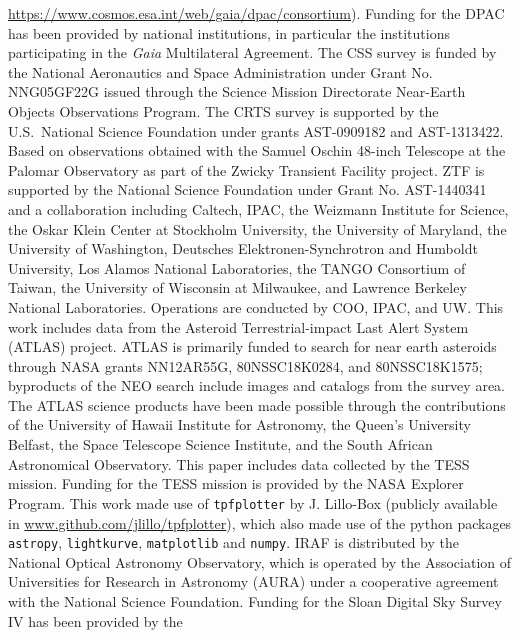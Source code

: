 \documentclass{aa}
\begin{document}
\begin{acknowledgements}
      \url{https://www.cosmos.esa.int/web/gaia/dpac/consortium}). Funding for the DPAC
      has been provided by national institutions, in particular the institutions
      participating in the {\it Gaia} Multilateral Agreement.
      The CSS survey is funded by the National Aeronautics and Space
      Administration under Grant No. NNG05GF22G issued through the Science
      Mission Directorate Near-Earth Objects Observations Program.  The CRTS
      survey is supported by the U.S.~National Science Foundation under
      grants AST-0909182 and AST-1313422.
      Based on observations obtained with the Samuel Oschin 48-inch Telescope
      at the Palomar Observatory as part of the Zwicky Transient Facility
      project. ZTF is supported by the National Science Foundation under Grant
      No. AST-1440341 and a collaboration including Caltech, IPAC, the
      Weizmann Institute for Science, the Oskar Klein Center at Stockholm
      University, the University of Maryland, the University of Washington,
      Deutsches Elektronen-Synchrotron and Humboldt University, Los Alamos
      National Laboratories, the TANGO Consortium of Taiwan, the University of
      Wisconsin at Milwaukee, and Lawrence Berkeley National Laboratories.
      Operations are conducted by COO, IPAC, and UW. 
      This work includes data from the Asteroid Terrestrial-impact
      Last Alert System (ATLAS) project. ATLAS is primarily funded to search
      for near earth asteroids through NASA grants NN12AR55G, 80NSSC18K0284,
      and 80NSSC18K1575; byproducts of the NEO search include images and
      catalogs from the survey area. The ATLAS science products have been made
      possible through the contributions of the University of Hawaii Institute
      for Astronomy, the Queen's University Belfast, the Space Telescope
      Science Institute, and the South African Astronomical Observatory.
      This paper includes data collected by the TESS mission. Funding for the
      TESS mission is provided by the NASA Explorer Program.
      This work made use of \texttt{tpfplotter} by J. Lillo-Box (publicly
      available in \url{www.github.com/jlillo/tpfplotter}), which also made
      use of the python packages \texttt{astropy}, \texttt{lightkurve},
      \texttt{matplotlib} and \texttt{numpy}.
      IRAF is distributed by the National Optical Astronomy Observatory,
      which is operated by the Association of Universities for Research in
      Astronomy (AURA) under a cooperative agreement with the National
      Science Foundation.
      Funding for the Sloan Digital Sky Survey IV has been provided by the

\end{acknowledgements}
\end{document}
